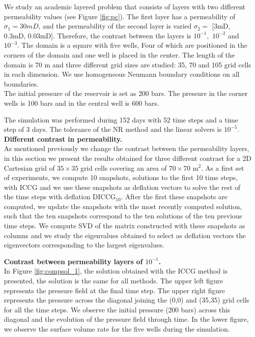 \documentclass[12pt]{article}
\begin{document}
We study an academic layered problem that consists of layers with two different permeability values 
(see Figure \ref{fig:pc}). The first layer has a permeability of $\sigma_1 = 30mD$, and the permeability 
of the second layer is varied $\sigma_2 =$ [3mD, 0.3mD, 0.03mD]. Therefore, the contrast between the layers 
is $10^{-1},$ $10^{-2}$ and $10^{-3}$.
The domain is a square with five wells, Four of which are positioned in the corners of the domain and one 
well is placed in the center. The length of the domain is 70 m and three different grid sizes are studied: 
35, 70 and 105 grid cells in each dimension.  We use homogeneous Neumann boundary conditions on all boundaries. \\
The initial pressure of the reservoir is set as 200 bars. The pressure in the corner wells is 100 bars and 
in the central well is 600 bars.  

The simulation was performed during 152 days with 52 time steps and a time step of 3 days. The tolerance of 
the NR method and the linear solvers is $10^{-5}$.\\
\newpage
\textbf{Different contrast in permeability.}\\
As mentioned previously we change the contrast between the permeability layers, in this section we present 
the results obtained for three different contrast for a 2D Cartesian grid of $35 \times 35$ grid cells covering 
an area of $70 \times 70$ m$^2$. As a first set of experiments, we compute 10 snapshots, solutions to the first 
10 time steps, with ICCG and we use these snapshots as deflation vectors to solve the rest of the time steps with 
deflation DICCG$_{10}$. After the first these snapshots are computed, we update the snapshots with the most recently 
computed solution, such that the ten snapshots correspond to the ten solutions of the ten previous time steps. 
We compute SVD of the matrix constructed with these snapshots as columns and we study the eigenvalues obtained 
to select as deflation vectors the eigenvectors corresponding to the largest eigenvalues. 

\textbf{Contrast between permeability layers of $10^{-1}$.}\\
In Figure \ref{fig:compsol_1}, the solution obtained with the ICCG method is presented, the solution is the same 
for all methods. The upper left figure represents the pressure field at the final time step. The upper right 
figure represents the pressure across the diagonal joining the (0,0) and (35,35) grid cells for all the time steps. 
We observe the initial pressure (200 bars) across this diagonal and the evolution of the pressure field through time. 
In the lower figure, we observe the surface volume rate for the five wells during the simulation.
\end{document}
